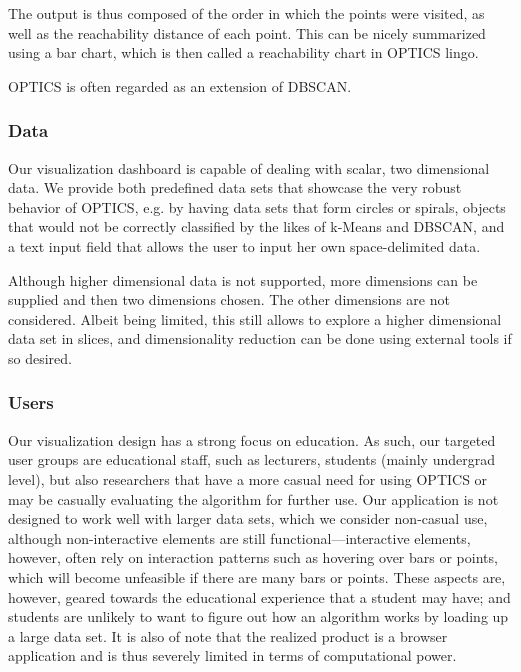 \documentclass{vgtc} %
\begin{document}
The output is thus composed of the order in which the points were visited, as
well as the reachability distance of each point. This can be nicely summarized
using a bar chart, which is then called a reachability chart in OPTICS lingo.

OPTICS is often regarded as an extension of DBSCAN.

\subsubsection{Data}

Our visualization dashboard is capable of dealing with scalar, two dimensional
data. We provide both predefined data sets that showcase the very robust
behavior of OPTICS, e.g. by having data sets that form circles or spirals,
objects that would not be correctly classified by the likes of k-Means and
DBSCAN, and a text input field that allows the user to input her own
space-delimited data.

Although higher dimensional data is not supported, more dimensions can be
supplied and then two dimensions chosen. The other dimensions are not
considered. Albeit being limited, this still allows to explore a higher
dimensional data set in slices, and dimensionality reduction can be done
using external tools if so desired.

\subsubsection{Users}

Our visualization design has a strong focus on education. As such, our targeted
user groups are educational staff, such as lecturers, students (mainly
undergrad level), but also researchers that have a more casual need for using
OPTICS or may be casually evaluating the algorithm for further use. Our
application is not designed to work well with larger data sets, which we
consider non-casual use, although non-interactive elements are still
functional---interactive elements, however, often rely on interaction patterns
such as hovering over bars or points, which will become unfeasible if there are
many bars or points. These aspects are, however, geared towards the educational
experience that a student may have; and students are unlikely to want to figure
out how an algorithm works by loading up a large data set. It is also of note
that the realized product is a browser application and is thus severely limited
in terms of computational power.
\end{document}
